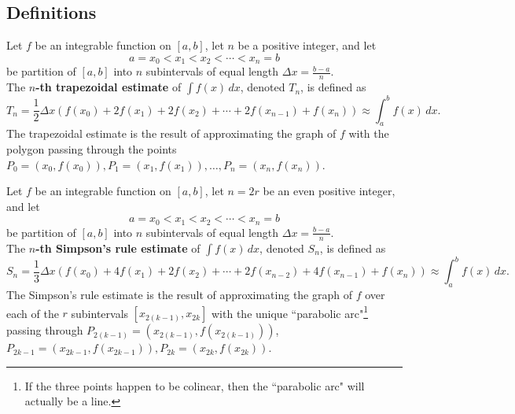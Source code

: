 \subsection*{Definitions}
\begin{namedtheorem} Let $f$ be an integrable function on $[a,b]$, let $n$ be a positive integer, and let
  \[
  a=x_0< x_1< x_2<\cdots < x_n=b
  \]
  be partition of $[a,b]$ into $n$ subintervals of equal length $\Delta x=\frac{b-a}{n}$.
  \vspace{.1in}
  \\
  The {\bf $n$-th trapezoidal estimate} of $\displaystyle\int f(x)\, dx$, denoted $T_n$, is defined as
  \[
  T_n=\frac{1}{2}\Delta x(f(x_0)+2f(x_1)+2f(x_2)+\cdots +2f(x_{n-1})+f(x_n))\approx \int_a^b f(x)\, dx.
  \]
  The trapezoidal estimate is the result of approximating the graph of $f$ with the polygon passing through the points $P_0=(x_0, f(x_0)), P_1=(x_1,f(x_1)), \dots, P_n=(x_n, f(x_n))$.
\end{namedtheorem}
\begin{namedtheorem}  Let $f$ be an integrable function on $[a,b]$, let $n=2r$ be an even positive integer, and let
  \[
  a=x_0< x_1< x_2<\cdots < x_n=b
  \]
  be partition of $[a,b]$ into $n$ subintervals of equal length $\Delta x=\frac{b-a}{n}$.
  \vspace{.1in}
  \\
  The {\bf $n$-th Simpson's rule estimate} of $\displaystyle\int f(x)\, dx$, denoted $S_n$, is defined as
  \[
  S_n=\frac{1}{3}\Delta x(f(x_0)+4f(x_1)+2f(x_2)+\cdots +2f(x_{n-2})+4f(x_{n-1})+f(x_n))\approx \int_a^b f(x)\, dx.
  \]
  The Simpson's rule estimate is the result of approximating the graph of $f$ over each of the $r$ subintervals $[x_{2(k-1)},x_{2k}]$ with the unique ``parabolic arc"\footnote{If the three points happen to be colinear, then the ``parabolic arc" will actually be a line.} passing through $P_{2(k-1)}=(x_{2(k-1)}, f(x_{2(k-1)}))$, $P_{2k-1}=(x_{2k-1}, f(x_{2k-1})), P_{2k}=(x_{2k},f(x_{2k}))$.
\end{namedtheorem}

